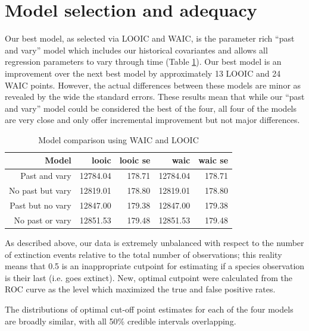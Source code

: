 \documentclass[12pt,letterpaper]{article}
\begin{document}
\section{Model selection and adequacy}

Our best model, as selected via LOOIC and WAIC, is the parameter rich ``past and vary'' model which includes our historical covariantes and allows all regression parameters to vary through time (Table \ref{tab:selection}). Our best model is an improvement over the next best model by approximately 13 LOOIC and 24 WAIC points. However, the actual differences between these models are minor as revealed by the wide the standard errors. These results mean that while our ``past and vary'' model could be considered the best of the four, all four of the models are very close and only offer incremental improvement but not major differences.
\begin{table}[ht]
  \centering
  \caption{Model comparison using WAIC and LOOIC}
  \begin{tabular}{ r r r r r }
    \hline
    Model & looic & looic se & waic & waic se \\
    \hline
    Past and vary & 12784.04 & 178.71 & 12784.04 & 178.71 \\
    No past but vary & 12819.01 & 178.80 & 12819.01 & 178.80 \\ 
    Past but no vary & 12847.00 & 179.38 & 12847.00 & 179.38 \\ 
    No past or vary & 12851.53 & 179.48 & 12851.53 & 179.48 \\ 
    \hline
  \end{tabular}
  \label{tab:selection}
\end{table}



As described above, our data is extremely unbalanced with respect to the number of extinction events relative to the total number of observations; this reality means that 0.5 is an inappropriate cutpoint for estimating if a species observation is their last (i.e. goes extinct). New, optimal cutpoint were calculated from the ROC curve as the level which maximized the true and false positive rates.

The distributions of optimal cut-off point estimates for each of the four models are broadly similar, with all 50\% credible intervals overlapping.
\end{document}
